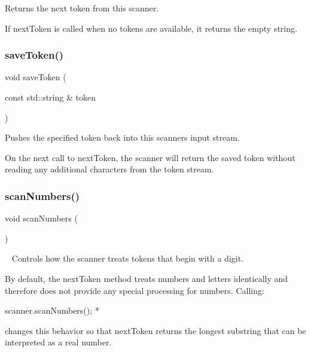 Returns the next token from this scanner. 

If {\ttfamily next\+Token} is called when no tokens are available, it returns the empty string. \mbox{\label{classTokenScanner_a6ca063c69febcb61e6b49a210563194f}} 
\subsubsection{\texorpdfstring{save\+Token()}{saveToken()}}
{\footnotesize\ttfamily void save\+Token (\begin{DoxyParamCaption}\item[{const std\+::string \&}]{token }\end{DoxyParamCaption})}



Pushes the specified token back into this scanner\textquotesingle{}s input stream. 

On the next call to {\ttfamily next\+Token}, the scanner will return the saved token without reading any additional characters from the token stream. \mbox{\label{classTokenScanner_a0bebe5cb8dd72954dc34cf5338db03dc}} 
\subsubsection{\texorpdfstring{scan\+Numbers()}{scanNumbers()}}
{\footnotesize\ttfamily void scan\+Numbers (\begin{DoxyParamCaption}{ }\end{DoxyParamCaption})}



~\newline
 Controls how the scanner treats tokens that begin with a digit. 

By default, the {\ttfamily next\+Token} method treats numbers and letters identically and therefore does not provide any special processing for numbers. Calling\+:


\begin{DoxyPre}
     scanner.scanNumbers();
*\end{DoxyPre}


changes this behavior so that {\ttfamily next\+Token} returns the longest substring that can be interpreted as a real number. \mbox{\label{classTokenScanner_af85e801b4ef298db6ddbfd539a8f45db}} 
